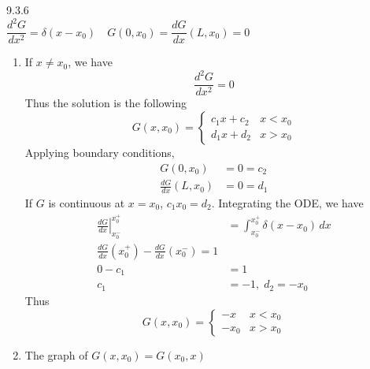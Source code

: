 \documentclass{article}
\theoremstyle{definition}
\begin{document}
    \begin{prob}{9.3.6} $ $ \vspace{2mm} \\
        $ \dfrac{d^2 G}{dx^2} = \delta(x-x_0) \quad G(0,x_0) = \dfrac{dG}{dx}(L,x_0)=0 $ \\
        \begin{enumerate}[label=\alph*.)]
            \item If $x\neq x_{0}$, we have
                \[
                    \frac{d^2G}{dx^2} = 0
                \]
                Thus the solution is the following
                \[
                    G(x,x_0) = \begin{cases} c_1x + c_2 &x<x_0 \\ d_1x + d_2 & x>x_0 \end{cases}
                \]
                Applying boundary conditions,
                \begin{align*}
                    G(0,x_0) &= 0 = c_2 \\
                    \frac{dG}{dx}(L,x_0) &= 0 = d_1
                \end{align*}
                If $G$ is continuous at $x=x_{0}$, $c_1x_{0}=d_{2}$. Integrating the ODE, we have
                \begin{align*}
                    \left. \frac{dG}{dx} \right|_{x_0^-}^{x_0^+} &= \int_{x_0^-}^{x_0^+} \delta(x-x_0) \, dx \\
                    \frac{dG}{dx}(x_0^+) - \frac{dG}{dx}(x_0^-) = 1 \\
                    0 - c_1 &= 1 \\
                    c_1 &= -1, \; d_2 = -x_0
                \end{align*}
                Thus
                \[
                    \boxed{ G(x,x_0) = \begin{cases} -x & x<x_0 \\ -x_0 & x>x_0  \end{cases} }
                \]
            \item The graph of $G(x,x_{0}) = G(x_{0},x)$
                \begin{center}
\end{center}
\end{enumerate}
\end{prob}
\end{document}
